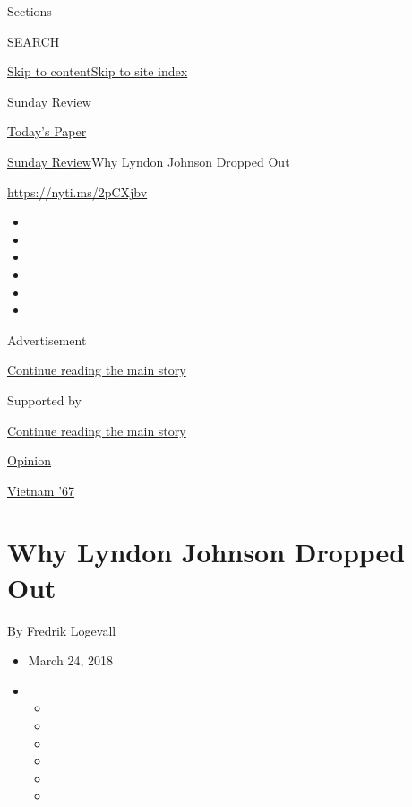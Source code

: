 Sections

SEARCH

\protect\hyperlink{site-content}{Skip to
content}\protect\hyperlink{site-index}{Skip to site index}

\href{https://www.nytimes.com/section/opinion/sunday}{Sunday Review}

\href{https://myaccount.nytimes.com/auth/login?response_type=cookie\&client_id=vi}{}

\href{https://www.nytimes.com/section/todayspaper}{Today's Paper}

\href{/section/opinion/sunday}{Sunday Review}\textbar{}Why Lyndon
Johnson Dropped Out

\href{https://nyti.ms/2pCXjbv}{https://nyti.ms/2pCXjbv}

\begin{itemize}
\item
\item
\item
\item
\item
\item
\end{itemize}

Advertisement

\protect\hyperlink{after-top}{Continue reading the main story}

Supported by

\protect\hyperlink{after-sponsor}{Continue reading the main story}

\href{/section/opinion}{Opinion}

\href{/column/vietnam-67}{Vietnam '67}

\hypertarget{why-lyndon-johnson-dropped-out}{%
\section{Why Lyndon Johnson Dropped
Out}\label{why-lyndon-johnson-dropped-out}}

By Fredrik Logevall

\begin{itemize}
\item
  March 24, 2018
\item
  \begin{itemize}
  \item
  \item
  \item
  \item
  \item
  \item
  \end{itemize}
\end{itemize}

